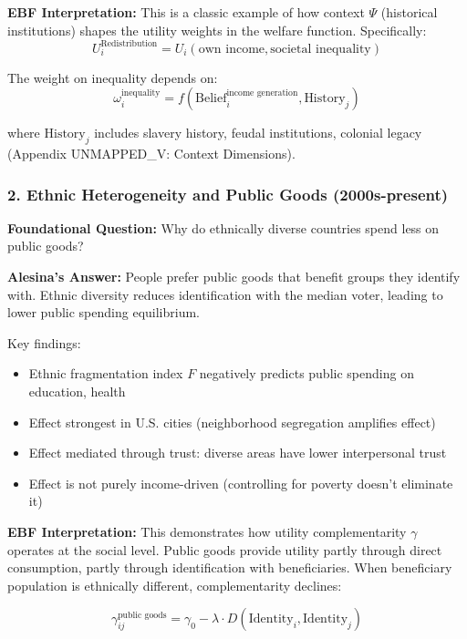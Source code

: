 \textbf{EBF Interpretation:} This is a classic example of how context $\Psi$ (historical institutions) shapes the utility weights in the welfare function. Specifically:
\begin{equation}
U^{\text{Redistribution}}_i = U_i(\text{own income}, \text{societal inequality})
\end{equation}

The weight on inequality depends on:
\begin{equation}
\omega_i^{\text{inequality}} = f(\text{Belief}_i^{\text{income generation}}, \text{History}_j)
\end{equation}

where $\text{History}_j$ includes slavery history, feudal institutions, colonial legacy (Appendix UNMAPPED_V: Context Dimensions).

\subsubsection{2. Ethnic Heterogeneity and Public Goods (2000s-present)}

\textbf{Foundational Question:} Why do ethnically diverse countries spend less on public goods?

\textbf{Alesina's Answer:} People prefer public goods that benefit groups they identify with. Ethnic diversity reduces identification with the median voter, leading to lower public spending equilibrium.

Key findings:
\begin{itemize}
\item Ethnic fragmentation index $F$ negatively predicts public spending on education, health
\item Effect strongest in U.S. cities (neighborhood segregation amplifies effect)
\item Effect mediated through trust: diverse areas have lower interpersonal trust
\item Effect is not purely income-driven (controlling for poverty doesn't eliminate it)
\end{itemize}

\textbf{EBF Interpretation:} This demonstrates how utility complementarity $\gamma$ operates at the social level. Public goods provide utility partly through direct consumption, partly through identification with beneficiaries. When beneficiary population is ethnically different, complementarity declines:

\begin{equation}
\gamma^{\text{public goods}}_{ij} = \gamma_0 - \lambda \cdot D(\text{Identity}_i, \text{Identity}_j)
\end{equation}

